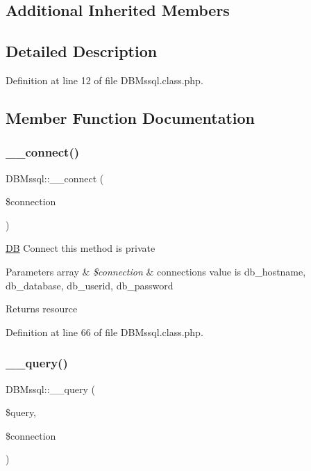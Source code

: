 \subsection*{Additional Inherited Members}


\subsection{Detailed Description}


Definition at line 12 of file D\+B\+Mssql.\+class.\+php.



\subsection{Member Function Documentation}
\hypertarget{classDBMssql_a369f968ee79e1eb30e5d640c2294a7d1}{}\label{classDBMssql_a369f968ee79e1eb30e5d640c2294a7d1} 
\subsubsection{\texorpdfstring{\+\_\+\+\_\+connect()}{\_\_connect()}}
{\footnotesize\ttfamily D\+B\+Mssql\+::\+\_\+\+\_\+connect (\begin{DoxyParamCaption}\item[{}]{\$connection }\end{DoxyParamCaption})}

\hyperlink{classDB}{DB} Connect this method is private 
\begin{DoxyParams}[1]{Parameters}
array & {\em \$connection} & connection\textquotesingle{}s value is db\+\_\+hostname, db\+\_\+database, db\+\_\+userid, db\+\_\+password \\
\hline
\end{DoxyParams}
\begin{DoxyReturn}{Returns}
resource 
\end{DoxyReturn}


Definition at line 66 of file D\+B\+Mssql.\+class.\+php.

\hypertarget{classDBMssql_aa2d0d2f6680d70399f493b567d94ed92}{}\label{classDBMssql_aa2d0d2f6680d70399f493b567d94ed92} 
\subsubsection{\texorpdfstring{\+\_\+\+\_\+query()}{\_\_query()}}
{\footnotesize\ttfamily D\+B\+Mssql\+::\+\_\+\+\_\+query (\begin{DoxyParamCaption}\item[{}]{\$query,  }\item[{}]{\$connection }\end{DoxyParamCaption})}

